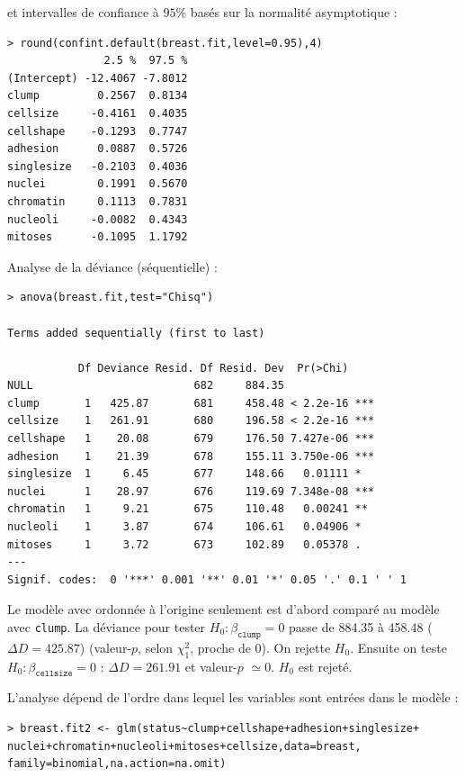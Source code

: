 \documentclass{BeamerTemplate}
\begin{document}
\begin{refsection}
\begin{frame}[fragile]{}
et  intervalles de confiance à $95\%$ basés sur la normalité asymptotique :
{\tiny
\begin{verbatim}
> round(confint.default(breast.fit,level=0.95),4)
               2.5 %  97.5 %
(Intercept) -12.4067 -7.8012
clump         0.2567  0.8134
cellsize     -0.4161  0.4035
cellshape    -0.1293  0.7747
adhesion      0.0887  0.5726
singlesize   -0.2103  0.4036
nuclei        0.1991  0.5670
chromatin     0.1113  0.7831
nucleoli     -0.0082  0.4343
mitoses      -0.1095  1.1792
\end{verbatim}
}
\end{frame}


\begin{frame}[fragile]{Analyse de la déviance (séquentielle) :}

{\tiny
\begin{verbatim}
> anova(breast.fit,test="Chisq")

Terms added sequentially (first to last)

           Df Deviance Resid. Df Resid. Dev  Pr(>Chi)    
NULL                         682     884.35              
clump       1   425.87       681     458.48 < 2.2e-16 ***
cellsize    1   261.91       680     196.58 < 2.2e-16 ***
cellshape   1    20.08       679     176.50 7.427e-06 ***
adhesion    1    21.39       678     155.11 3.750e-06 ***
singlesize  1     6.45       677     148.66   0.01111 *  
nuclei      1    28.97       676     119.69 7.348e-08 ***
chromatin   1     9.21       675     110.48   0.00241 ** 
nucleoli    1     3.87       674     106.61   0.04906 *  
mitoses     1     3.72       673     102.89   0.05378 .  
---
Signif. codes:  0 '***' 0.001 '**' 0.01 '*' 0.05 '.' 0.1 ' ' 1
\end{verbatim}
}

Le modèle avec ordonnée à l'origine seulement est d'abord comparé au modèle
avec \texttt{clump}. La déviance pour tester $H_0:
\beta_{\texttt{clump}}=0$ passe de 884.35 à 458.48 ($\Delta D = 425.87$) (valeur-$p$, selon $\chi^2_1$, proche de 0). On rejette $H_0$.
Ensuite on teste $H_0: \beta_{\texttt{cellsize}}=0$ : $\Delta D = 261.91$ et valeur-$p$
$\simeq 0$. $H_0$ est rejeté.
\end{frame}


\begin{frame}[fragile]{}
L'analyse dépend de l'ordre dans lequel les variables sont entrées dans le modèle :

{\scriptsize
\begin{verbatim}
> breast.fit2 <- glm(status~clump+cellshape+adhesion+singlesize+
nuclei+chromatin+nucleoli+mitoses+cellsize,data=breast,
family=binomial,na.action=na.omit)


\end{verbatim}}
\end{frame}
\end{refsection}
\end{document}
